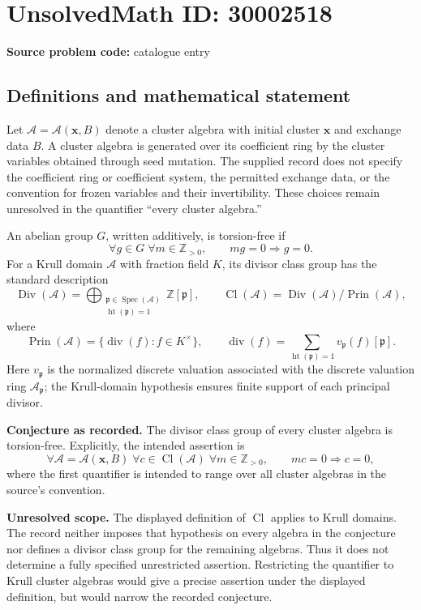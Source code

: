 \documentclass[11pt]{article}
\newcommand{\Z}{\mathbb{Z}}
\begin{document}
\section*{UnsolvedMath ID: 30002518}
\textbf{Source problem code:} catalogue entry
\subsection{Definitions and mathematical statement}
Let \(\mathcal A=\mathcal A(\mathbf x,B)\) denote a cluster algebra with initial cluster \(\mathbf x\) and exchange data \(B\). A cluster algebra is generated over its coefficient ring by the cluster variables obtained through seed mutation. The supplied record does not specify the coefficient ring or coefficient system, the permitted exchange data, or the convention for frozen variables and their invertibility. These choices remain unresolved in the quantifier ``every cluster algebra.''

An abelian group \(G\), written additively, is torsion-free if
\[
\forall g\in G\;\forall m\in\Z_{>0},\qquad mg=0\Longrightarrow g=0.
\]
For a Krull domain \(\mathcal A\) with fraction field \(K\), its divisor class group has the standard description
\[
\operatorname{Div}(\mathcal A)
 =\bigoplus_{\substack{\mathfrak p\in\operatorname{Spec}(\mathcal A)\\\operatorname{ht}(\mathfrak p)=1}}\Z[\mathfrak p],
\qquad
\operatorname{Cl}(\mathcal A)
 =\operatorname{Div}(\mathcal A)\big/\operatorname{Prin}(\mathcal A),
\]
where
\[
\operatorname{Prin}(\mathcal A)
 =\{\operatorname{div}(f):f\in K^{\times}\},
\qquad
\operatorname{div}(f)
 =\sum_{\operatorname{ht}(\mathfrak p)=1}v_{\mathfrak p}(f)[\mathfrak p].
\]
Here \(v_{\mathfrak p}\) is the normalized discrete valuation associated with the discrete valuation ring \(\mathcal A_{\mathfrak p}\); the Krull-domain hypothesis ensures finite support of each principal divisor.

\textbf{Conjecture as recorded.} The divisor class group of every cluster algebra is torsion-free. Explicitly, the intended assertion is
\[
\forall\mathcal A=\mathcal A(\mathbf x,B)\;\forall c\in\operatorname{Cl}(\mathcal A)\;\forall m\in\Z_{>0},
\qquad mc=0\Longrightarrow c=0,
\]
where the first quantifier is intended to range over all cluster algebras in the source's convention.

\textbf{Unresolved scope.} The displayed definition of \(\operatorname{Cl}\) applies to Krull domains. The record neither imposes that hypothesis on every algebra in the conjecture nor defines a divisor class group for the remaining algebras. Thus it does not determine a fully specified unrestricted assertion. Restricting the quantifier to Krull cluster algebras would give a precise assertion under the displayed definition, but would narrow the recorded conjecture.
\end{document}
